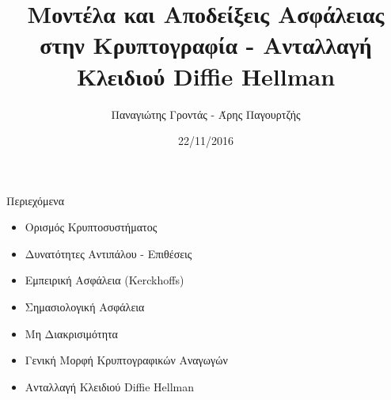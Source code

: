 \documentclass[handout]{beamer}
\title{Μοντέλα και Αποδείξεις Ασφάλειας στην Κρυπτογραφία - Ανταλλαγή Κλειδιού Diffie Hellman}
\author{Παναγιώτης Γροντάς - Άρης Παγουρτζής}
\date{22/11/2016}
\institute{ΕΜΠ - Κρυπτογραφία (2016-2017)}
\begin{document}
\newcommand{\MSG}{ \mathtt{M} }
\newcommand{\KEY}{ \mathtt{K} }
\newcommand{\CPH}{ \mathtt{C} }
\newcommand{\keygen}{\mathtt{KeyGen}}
\newcommand{\enc}{\mathtt{Encrypt}}
\newcommand{\dec}{\mathtt{Decrypt}}
\newcommand{\adv}{$\mathcal{A} \,$ }
\newcommand{\advb}{$\mathcal{B} \,$ }
\newcommand{\chal}{$\mathcal{C} \,$ }
\newcommand{\cs}{$\mathcal{CS} \,$ }

\newcommand{\green}[1]{\textcolor{teal}{#1}}
\newcommand{\Green}[1]{\textcolor{Teal}{#1}}
\newcommand{\ForestGreen}[1]{\textcolor{ForestGreen}{#1}}
\newcommand{\blue}[1]{\textcolor{blue}{#1}}
\newcommand{\magenta}[1]{\textcolor{magenta}{#1}}
\newcommand{\cyan}[1]{\textcolor{cyan}{#1}}

\newcommand{\twopartdef}[4]
{ 
		\begin{cases}
			#1 , #2 \\
			#3 , #4
		\end{cases} 
}
\begin{frame}
\titlepage
\end{frame}



\begin{frame}{Περιεχόμενα}
\begin{itemize}
\item Ορισμός Κρυπτοσυστήματος
\item Δυνατότητες Αντιπάλου - Επιθέσεις
\item Εμπειρική Ασφάλεια (Kerckhoffs)
\item Σημασιολογική Ασφάλεια 
\item Μη Διακρισιμότητα
\item Γενική Μορφή Κρυπτογραφικών Αναγωγών
\item Ανταλλαγή Κλειδιού Diffie Hellman
\end{itemize}
\end{frame}
\end{document}
